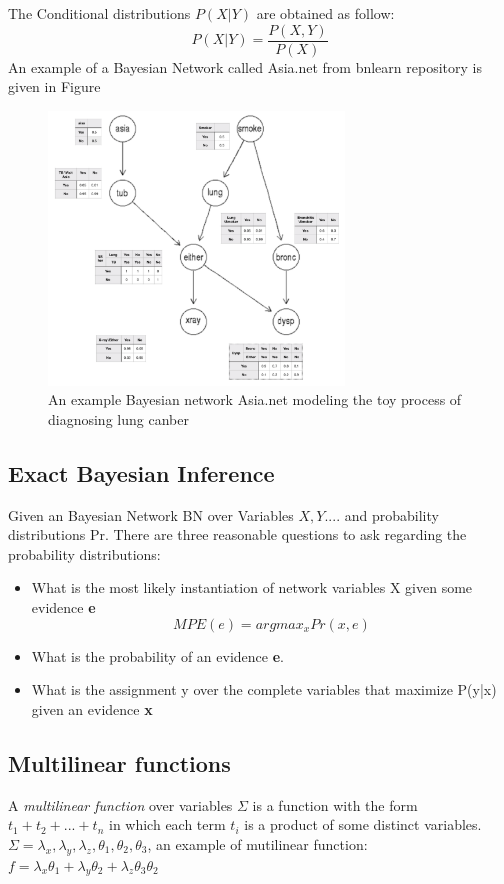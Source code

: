     The Conditional distributions $P(X|Y)$ are obtained as follow:
    $$P(X|Y) = \frac{P(X,Y)}{P(X)}$$
    An example of a Bayesian Network called Asia.net from bnlearn repository is given in Figure 
    
    \begin{figure}
        \centering
        \includegraphics[width = 0.7\textwidth]{pic/full-asia.png}
        \caption{An example Bayesian network Asia.net modeling the toy process of diagnosing lung canber}
        \label{fig:asia-net}
    \end{figure}
    
    \subsection{Exact Bayesian Inference}
    Given an Bayesian Network BN over Variables ${X, Y...}$. and probability distributions Pr. There are three reasonable questions to ask regarding the probability distributions:
    \begin{itemize}
        \item What is the most likely instantiation of network variables X given some evidence \textbf{e}
        $$MPE(e) = argmax_{x} Pr(x, e)$$
        \item What is the probability of an evidence \textbf{e}.
        \item What is the assignment y over the complete variables that maximize P(y|x) given an evidence \textbf{x}
    \end{itemize}
    \subsection{Multi\-linear functions}
    A \textit{multi\-linear function} over variables $\Sigma$ is a function
    with the form $t_{1} + t_{2} + ... + t_{n}$ in which each term $t_{i}$ is a product of some distinct variables. \\
    $\Sigma = \lambda_{x}, \lambda_{y}, \lambda_{z}, \theta_{1}, \theta_{2}, \theta_{3}$, an example of muti\-linear function: $f = \lambda_{x}\theta_{1} + \lambda_{y}\theta_{2} + \lambda_{z}\theta_{3}\theta_{2}$
